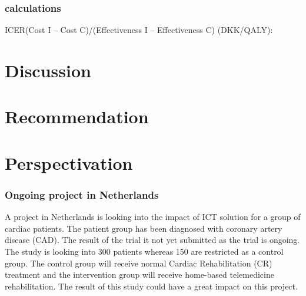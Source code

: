 \subsection{calculations}

ICER(Cost I – Cost C)/(Effectiveness I – Effectiveness C) (DKK/QALY):

\chapter{Discussion}






\chapter{Recommendation}

\chapter{Perspectivation}
\subsection{Ongoing project in Netherlands}

A project in Netherlands is looking into the impact of ICT solution for a group of cardiac patients. The patient group has been diagnosed with coronary artery disease (CAD). The result of the trial it not yet submitted as the trial is ongoing. The study is looking into 300 patients whereas 150 are restricted as a control group. The control group will receive normal Cardiac Rehabilitation (CR) treatment and the intervention group will receive home-based telemedicine rehabilitation\cite{CAD}. 
The result of this study could have a great impact on this project.
